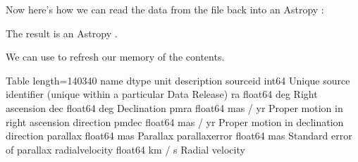\documentclass[letterpaper,10pt,english]{sphinxmanual}
\begin{document}
Now here’s how we can read the data from the file back into an Astropy :

\begin{sphinxVerbatim}[commandchars=\\\{\}]
   

  
\end{sphinxVerbatim}

The result is an Astropy .

We can use  to refresh our memory of the contents.

\begin{sphinxVerbatim}[commandchars=\\\{\}]
\end{sphinxVerbatim}

\begin{sphinxVerbatim}[commandchars=\\\{\}]
\PYGZlt{}Table length=140340\PYGZgt{}
      name       dtype    unit                              description                            
\PYGZhy{}\PYGZhy{}\PYGZhy{}\PYGZhy{}\PYGZhy{}\PYGZhy{}\PYGZhy{}\PYGZhy{}\PYGZhy{}\PYGZhy{}\PYGZhy{}\PYGZhy{}\PYGZhy{}\PYGZhy{}\PYGZhy{} \PYGZhy{}\PYGZhy{}\PYGZhy{}\PYGZhy{}\PYGZhy{}\PYGZhy{}\PYGZhy{} \PYGZhy{}\PYGZhy{}\PYGZhy{}\PYGZhy{}\PYGZhy{}\PYGZhy{}\PYGZhy{}\PYGZhy{} \PYGZhy{}\PYGZhy{}\PYGZhy{}\PYGZhy{}\PYGZhy{}\PYGZhy{}\PYGZhy{}\PYGZhy{}\PYGZhy{}\PYGZhy{}\PYGZhy{}\PYGZhy{}\PYGZhy{}\PYGZhy{}\PYGZhy{}\PYGZhy{}\PYGZhy{}\PYGZhy{}\PYGZhy{}\PYGZhy{}\PYGZhy{}\PYGZhy{}\PYGZhy{}\PYGZhy{}\PYGZhy{}\PYGZhy{}\PYGZhy{}\PYGZhy{}\PYGZhy{}\PYGZhy{}\PYGZhy{}\PYGZhy{}\PYGZhy{}\PYGZhy{}\PYGZhy{}\PYGZhy{}\PYGZhy{}\PYGZhy{}\PYGZhy{}\PYGZhy{}\PYGZhy{}\PYGZhy{}\PYGZhy{}\PYGZhy{}\PYGZhy{}\PYGZhy{}\PYGZhy{}\PYGZhy{}\PYGZhy{}\PYGZhy{}\PYGZhy{}\PYGZhy{}\PYGZhy{}\PYGZhy{}\PYGZhy{}\PYGZhy{}\PYGZhy{}\PYGZhy{}\PYGZhy{}\PYGZhy{}\PYGZhy{}\PYGZhy{}\PYGZhy{}\PYGZhy{}\PYGZhy{}\PYGZhy{}
      source\PYGZus{}id   int64          Unique source identifier (unique within a particular Data Release)
             ra float64      deg                                                    Right ascension
            dec float64      deg                                                        Declination
           pmra float64 mas / yr                         Proper motion in right ascension direction
          pmdec float64 mas / yr                             Proper motion in declination direction
       parallax float64      mas                                                           Parallax
 parallax\PYGZus{}error float64      mas                                         Standard error of parallax
radial\PYGZus{}velocity float64   km / s                                                    Radial velocity
\end{sphinxVerbatim}
\end{document}
